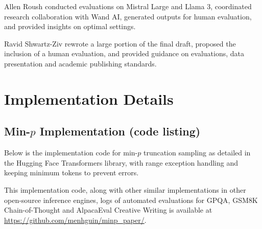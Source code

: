 \documentclass{article}
\begin{document}
Allen Roush conducted evaluations on Mistral Large and Llama 3, coordinated research collaboration with Wand AI, generated outputs for human evaluation, and provided insights on optimal settings.

Ravid Shwartz-Ziv rewrote a large portion of the final draft, proposed the inclusion of a human evaluation, and provided guidance on evaluations, data presentation and academic publishing standards.




\appendix

\section{Implementation Details}
\subsection{Min-\texorpdfstring{$p$}{p} Implementation (code listing)}
\label{app:implementation}
Below is the implementation code for min-\( p \) truncation sampling as detailed in the Hugging Face Transformers library, with range exception handling and keeping minimum tokens to prevent errors.

This implementation code, along with other similar implementations in other open-source inference engines, logs of automated evaluations for GPQA, GSM8K Chain-of-Thought and AlpacaEval Creative Writing is available at \url{https://github.com/menhguin/minp_paper/}.
\end{document}
